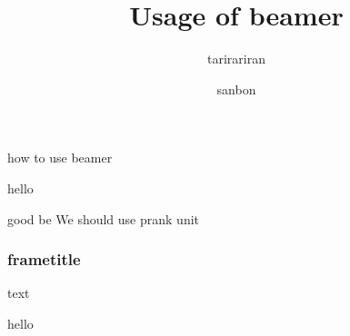 \documentclass[lualatex]{beamer}
\title{Usage of beamer}
\subtitle{tarirariran}
\author{sanbon}
\institute{chuo junior high school}
\begin{document}
	\begin{frame}{how to use beamer}
		\titlepage
	\end{frame}

	\begin{frame}{hello}
		\begin{block}{good be}
			We should use prank unit
		\end{block}
	\end{frame}

	\begin{frame}
		\frametitle{frametitle}
		text
	\end{frame}


	\begin{frame}{hello}
		
	\end{frame}
\end{document}
